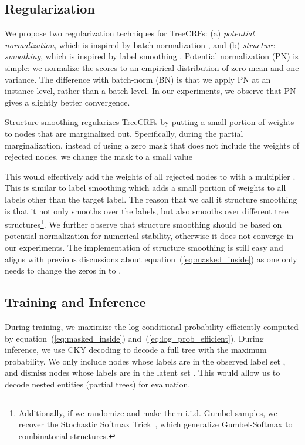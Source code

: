 \subsection{Regularization} 
\label{ssec:regularization}
We propose two regularization techniques for TreeCRFs: (a)
\textit{potential normalization}, which is inspired by batch normalization \citep{Ioffe2015BatchNA}, and (b) \textit{structure smoothing}, which is inspired by label smoothing  \citep{Mller2019WhenDL}. 
Potential normalization (PN) is simple: we normalize the scores  to an empirical distribution of zero mean and one variance. 
The difference with batch-norm (BN) is that we apply PN at an instance-level, rather than a batch-level. 
In our experiments, we observe that PN gives a slightly better convergence. 

Structure smoothing regularizes TreeCRFs by putting a small portion of weights to nodes that are marginalized out. 
Specifically, during the partial marginalization, instead of using a zero mask that does not include the weights of rejected nodes, we change the mask to a small value 


This would effectively add the weights of all rejected nodes to  with a multiplier . 
This is similar to label smoothing which adds a small portion of weights to all labels other than the target label. 
The reason that we call it structure smoothing is that it not only smooths over the labels, but also smooths over different tree structures\footnote{Additionally, if we randomize  and make them i.i.d. Gumbel samples, we recover the Stochastic Softmax Trick~\citep{paulus2020gradient}, which generalize Gumbel-Softmax to combinatorial structures.}. 
We further observe that structure smoothing should be based on potential normalization for numerical stability, otherwise it does not converge in our experiments. 
The implementation of structure smoothing is still easy and aligns with previous discussions about equation~(\ref{eq:masked_inside})
as one only needs to change the zeros in  to . 





\subsection{Training and Inference} 
\label{ssec:training_inference}
During training,
we maximize the log conditional probability  efficiently computed by equation~(\ref{eq:masked_inside}) and~(\ref{eq:log_prob_efficient}).
During inference, we use CKY decoding to decode a full tree with the maximum probability. 
We only include nodes whose labels are in the observed label set , and dismiss nodes whose labels are in the latent set .
This would allow us to decode nested entities (partial trees) for evaluation. 



%
